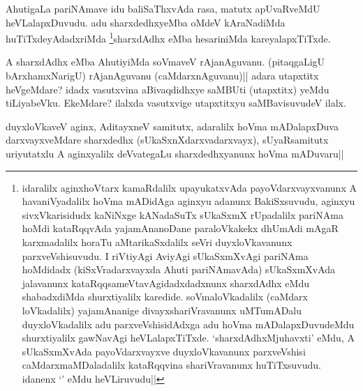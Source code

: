 
\begin{artha}
AhutigaLa pariNAmave idu baliSaThxvAda rasa, matutx apUvaRveMdU 
heVLalapxDuvudu. adu sharxdedhxyeMba oMdeV kAraNadiMda 
huTiTxdeyAdadxriMda \footnote[2]{idaralilx aginxhoVtarx kamaRdalilx 
upayukatxvAda payoVdarxvayxvanunx A havaniVyadalilx hoVma mADidAga 
aginxyu adanunx BakiSxsuvudu, aginxyu sivxVkarisidudx kaNiNxge 
kANadaSuTx sUkaSxmX rUpadalilx pariNAma hoMdi kataRqqvAda 
yajamAnanoDane paraloVkakekx dhUmAdi mAgaR karxmadalilx horaTu 
aMtarikaSxdalilx seVri duyxloVkavanunx parxveVshisuvudu. I riVtiyAgi 
AviyAgi sUkaSxmXvAgi pariNAma hoMdidadx (kiSxVradarxvayxda Ahuti 
pariNAmavAda) sUkaSxmXvAda jalavanunx kataRqqsameVtavAgidadxdadxnunx 
sharxdAdhx eMdu shabadxdiMda shurxtiyalilx karedide. soVmaloVkadalilx 
(caMdarx loVkadalilx) yajamAnanige divayxshariVravanunx uMTumADalu 
duyxloVkadalilx adu parxveVshisidAdxga adu hoVma mADalapxDuvudeMdu 
shurxtiyalilx gawNavAgi heVLalapxTiTxde. `sharxdAdhxMjuhavxti' eMdu, A 
sUkaSxmXvAda payoVdarxvayxve duyxloVkavanunx parxveVshisi 
caMdarxmaMDaladalilx kataRqqvina shariVravanunx huTiTxsuvudu. idanenx 
`\stext' eMdu heVLiruvudu||}sharxdAdhx eMba hesariniMda 
kareyalapxTiTxde.
\end{artha}


\begin{artha}
A sharxdAdhx eMba AhutiyiMda soVmaveV rAjanAguvanu. (pitaqgaLigU 
bArxhamxNarigU) rAjanAguvanu (caMdarxnAguvanu)|| adara utapxtitx 
heVgeMdare? idadx vasutxvina aBivaqdidhxye saMBUti (utapxtitx) yeMdu 
tiLiyabeVku. EkeMdare? ilalxda vasutxvige utapxtitxyu saMBavisuvudeV 
ilalx.
\end{artha}


\begin{artha}
duyxloVkaveV aginx, AditayxneV samitutx, adaralilx hoVma mADalapxDuva 
darxvayxveMdare sharxdedhx (sUkaSxnXdarxvadarxvayx), sUyaRsamitutx 
uriyutatxlu A aginxyalilx deVvategaLu sharxdedhxyanunx hoVma mADuvaru||
\end{artha}


